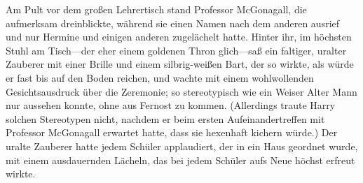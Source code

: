 Am Pult vor dem großen Lehrertisch stand Professor McGonagall, die aufmerksam dreinblickte, während sie einen Namen nach dem anderen ausrief und nur Hermine und einigen anderen zugelächelt hatte. Hinter ihr, im höchsten Stuhl am Tisch—der eher einem goldenen Thron glich—saß ein faltiger, uralter Zauberer mit einer Brille und einem silbrig-weißen Bart, der so wirkte, als würde er fast bis auf den Boden reichen, und wachte mit einem wohlwollenden Gesichtsausdruck über die Zeremonie; so stereotypisch wie ein Weiser Alter Mann nur aussehen konnte, ohne aus Fernost zu kommen. (Allerdings traute Harry solchen Stereotypen nicht, nachdem er beim ersten Aufeinandertreffen mit Professor McGonagall erwartet hatte, dass sie hexenhaft kichern würde.) Der uralte Zauberer hatte jedem Schüler applaudiert, der in ein Haus geordnet wurde, mit einem ausdauernden Lächeln, das bei jedem Schüler aufs Neue höchst erfreut wirkte.

